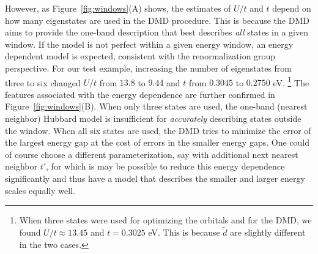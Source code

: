 However, as Figure~\ref{fig:windows}(A) shows, the estimates of $U/t$ and $t$ depend on how many eigenstates 
are used in the DMD procedure. This is because the DMD aims to provide the one-band description 
that best describes \textit{all} states in a given window. If the model is not perfect within a given energy window, 
an energy dependent model is expected, consistent with the renormalization group perspective. For our test example, 
increasing the number of eigenstates from three to six changed $U/t$ from $13.8$ to $9.44$ and $t$ from $0.3045$ to $0.2750$ eV.
\footnote{When three states were used for optimizing the orbitals and for the DMD, we found $U/t\approx 13.45$ and $t=0.3025$ eV. 
This is because $\tilde{d}$ are slightly different in the two cases.} 
The features associated with the energy dependence are further confirmed in Figure~\ref{fig:windows}(B). 
When only three states are used, the one-band (nearest neighbor) Hubbard model is insufficient for \textit{accurately}
describing states outside the window. When all six states are used, the DMD tries to minimize the error of the 
largest energy gap at the cost of errors in the smaller energy gaps. 
One could of course choose a different parameterization, say with additional next nearest neighbor $t'$, for which is 
may be possible to reduce this energy dependence significantly and thus have a model that describes the smaller 
and larger energy scales equally well.
 
 
